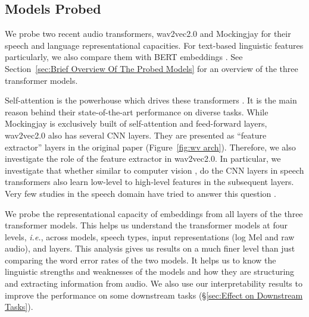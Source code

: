 \documentclass[sigconf]{acmart}
\newcommand{\wv}{wav2vec2.0\xspace}
\newcommand{\mj}{Mockingjay\xspace}
\begin{document}
\subsection{Models Probed}
\label{sec:models probed}
We probe two recent audio transformers, \wv and \mj for their speech and language representational capacities. For text-based linguistic features particularly, we also compare them with BERT embeddings \cite{devlinetal2019bert}. See Section~\ref{sec:Brief Overview Of The Probed Models} for an overview of the three transformer models. 

Self-attention is the powerhouse which drives these transformers \cite{vaswani2017attention}. It is the main reason behind their state-of-the-art performance on diverse tasks. While \mj is exclusively built of self-attention and feed-forward layers, \wv also has several CNN layers. They are presented as ``feature extractor'' layers in the original paper (Figure~\ref{fig:wv arch}). Therefore, we also investigate the role of the feature extractor in wav2vec2.0. In particular, we investigate that whether similar to computer vision \cite{erhan2010understanding,krizhevsky2012imagenet,girshick2014rich}, do the CNN layers in speech transformers also learn low-level to high-level features in the subsequent layers. Very few studies in the speech domain have tried to answer this question \cite{zhang2018visualization}. %


We probe the representational capacity of embeddings from all layers of the three transformer models. This helps us understand the transformer models at four levels, \textit{i.e.}, across models, speech types, input representations (log Mel and raw audio), and layers. This analysis gives us results on a much finer level than just comparing the word error rates of the two models. It helps us to know the linguistic strengths and weaknesses of the models and how they are structuring and extracting information from audio. We also use our interpretability results to improve the performance on some downstream tasks (\S\ref{sec:Effect on Downstream Tasks}).
\end{document}
